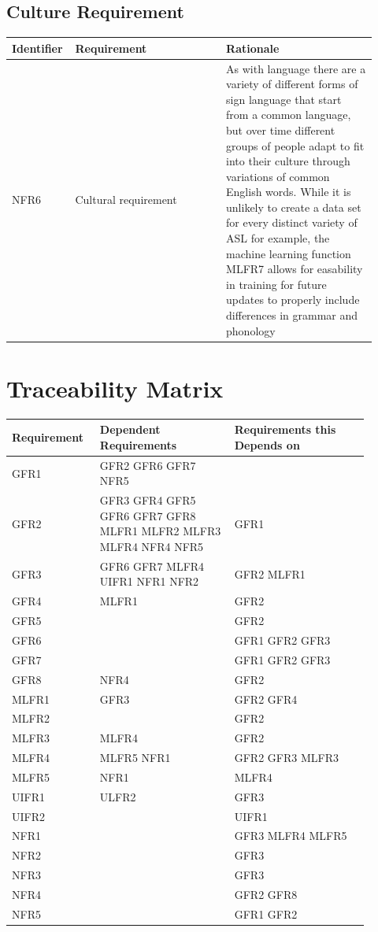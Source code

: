 \documentclass[12pt]{article}
\begin{document}
\subsection{Culture Requirement}

\renewcommand{\arraystretch}{1.2}
\noindent \begin{tabularx}{\textwidth}{p{0.12\linewidth}|p{0.4\linewidth}|p{0.4\linewidth}}
\toprule
\textbf{Identifier} & \textbf{Requirement} & \textbf{Rationale}\\
\midrule
NFR6
& Cultural requirement
& As with language there are a variety of different forms of sign language that start from a common language, but over time different groups of people 
adapt to fit into their culture through variations of common English words. While it is unlikely to create a data set for every distinct variety of ASL for 
example, the machine learning function MLFR7 allows for easability in training for future updates to properly include differences in grammar and phonology\\
\bottomrule
\end{tabularx}

\section{Traceability Matrix}
\renewcommand{\arraystretch}{1.2}
\noindent \begin{tabularx}{\textwidth}{p{0.2\linewidth}|p{0.35\linewidth}|p{0.35\linewidth}}
\toprule
\textbf{Requirement} & \textbf{Dependent Requirements} & \textbf{Requirements this Depends on}\\
\midrule
GFR1
& GFR2 GFR6 GFR7 NFR5\\
\hline
GFR2
& GFR3 GFR4 GFR5 GFR6 GFR7 GFR8 MLFR1 MLFR2 MLFR3 MLFR4 NFR4 NFR5
& GFR1\\
\hline
GFR3
& GFR6 GFR7 MLFR4 UIFR1 NFR1 NFR2
& GFR2 MLFR1\\
\hline
GFR4
& MLFR1
& GFR2\\
\hline
GFR5
&
& GFR2\\
\hline
GFR6
&
& GFR1 GFR2 GFR3\\
\hline
GFR7
&
& GFR1 GFR2 GFR3\\
\hline
GFR8
& NFR4
& GFR2\\
\hline
MLFR1
& GFR3
& GFR2 GFR4\\
\hline
MLFR2
&
& GFR2\\
\hline
MLFR3
& MLFR4
& GFR2\\
\hline
MLFR4
& MLFR5 NFR1
& GFR2 GFR3 MLFR3\\
\hline
MLFR5
& NFR1
& MLFR4\\
\hline
UIFR1
& ULFR2
& GFR3\\
\hline
UIFR2
&
& UIFR1\\
\hline
NFR1
&
& GFR3 MLFR4 MLFR5\\
\hline
NFR2
&
& GFR3\\
\hline
NFR3
&
& GFR3\\
\hline
NFR4
&
& GFR2 GFR8\\
\hline
NFR5
&
& GFR1 GFR2\\
\bottomrule
\end{tabularx}
\end{document}
